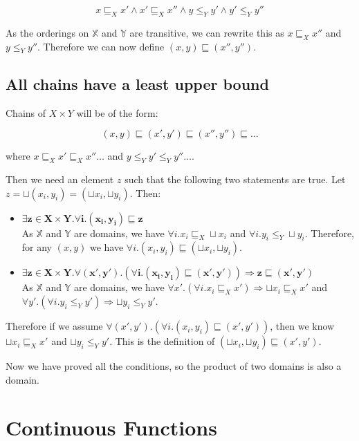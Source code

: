 \[x \sqsubseteq_X x' \wedge x' \sqsubseteq_X x'' \wedge y \leq_Y y' \wedge y' \leq_Y y'' \]

As the orderings on $\mathbb{X}$ and $\mathbb{Y}$ are transitive, we can rewrite this as $x \sqsubseteq_X x''$ and $y \leq_Y y''$. Therefore we can now define $(x,y) \sqsubseteq (x'',y'')$.

\subsection{All chains have a least upper bound}
Chains of $X \times Y$ will be of the form:

\[(x,y) \sqsubseteq (x', y') \sqsubseteq (x'', y'') \sqsubseteq \dots \]

where $x \sqsubseteq_X x' \sqsubseteq_X x'' \dots$ and $y \leq_Y y' \leq_Y y'' \dots $.

Then we need an element $z$ such that the following two statements are true. Let $z = \sqcup (x_i, y_i) = (\sqcup x_i, \sqcup y_i)$. Then:

\begin{itemize}
\item{$\mathbf{\exists z \in X \times Y . \forall i. (x_i, y_i) \sqsubseteq z}$ \\
As $\mathbb{X}$ and $\mathbb{Y}$ are domains, we have $\forall i. x_i \sqsubseteq_X \sqcup x_i$ and  $\forall i. y_i \leq_Y \sqcup y_i$. Therefore, for any $(x,y)$ we have $\forall i. (x_i ,y_i) \sqsubseteq (\sqcup x_i , \sqcup y_i)$.}
\item{$\mathbf{\exists z \in X \times Y . \forall (x',y'). (\forall i . (x_i,y_i) \sqsubseteq (x',y')) \Rightarrow z \sqsubseteq (x',y')}$\\
As $\mathbb{X}$ and $\mathbb{Y}$ are domains, we have $\forall x'. (\forall i. x_i \sqsubseteq_X x') \Rightarrow \sqcup x_i \sqsubseteq_X x'$ and $\forall y'. (\forall i. y_i \leq_Y y') \Rightarrow \sqcup y_i \leq_Y y'$.}
\end{itemize}

 Therefore if we assume $\forall (x',y'). (\forall i . (x_i,y_i) \sqsubseteq (x',y'))$, then we know $\sqcup x_i \sqsubseteq_X x'$ and $\sqcup y_i \leq_Y y'$. This is the definition of $(\sqcup x_i , \sqcup y_i) \sqsubseteq (x',y')$.

\vspace{0.25cm}

Now we have proved all the conditions, so the product of two domains is also a domain.

\section{Continuous Functions}

